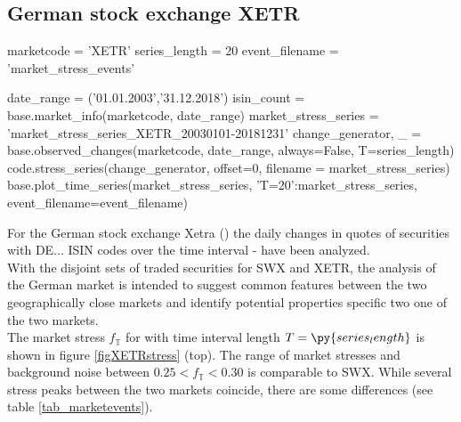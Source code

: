 \documentclass[11pt,twoside,a4paper]{article}
\numberwithin{equation}{section}
\begin{document}
\subsection{German stock exchange XETR}
\begin{pycode}
marketcode = 'XETR'
series_length = 20
event_filename = 'market_stress_events'

date_range = ('01.01.2003','31.12.2018')
isin_count = base.market_info(marketcode, date_range)
market_stress_series = 'market_stress_series_XETR_20030101-20181231'
change_generator, _ = base.observed_changes(marketcode, date_range, always=False, T=series_length)
code.stress_series(change_generator, offset=0, filename = market_stress_series)
base.plot_time_series(market_stress_series, {'T=20':market_stress_series}, event_filename=event_filename)
\end{pycode}
For the German stock exchange Xetra () the daily changes in quotes of  securities with DE... ISIN codes over the time interval  -  have been analyzed.\\
With the disjoint sets of traded securities for SWX and XETR, the analysis of the German market is intended to suggest common features between the two geographically close markets and identify potential properties specific two one of the two markets.\\

The market stress $f_\mathbb{T}$ for  with time interval length $T=\py{series_length}$ is shown in figure \ref{figXETRstress} (top). The range of market stresses and background noise between $0.25 < f_\mathbb{T} < 0.30$ is comparable to SWX. While several stress peaks between the two markets coincide, there are some differences (see table \ref{tab_marketevents}).\\
\end{document}
